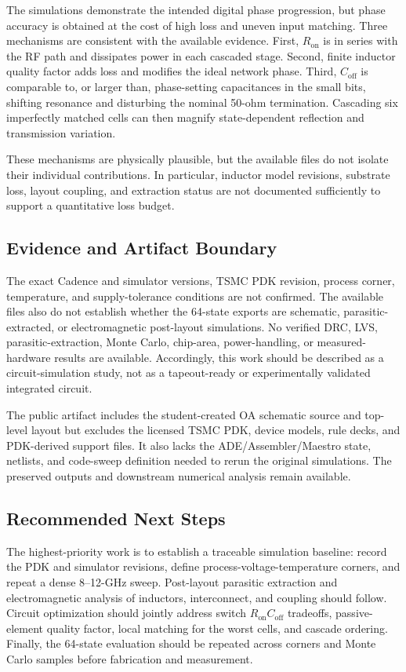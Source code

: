 \documentclass[conference]{IEEEtran}
\begin{document}
The simulations demonstrate the intended digital phase progression, but phase
accuracy is obtained at the cost of high loss and uneven input matching. Three
mechanisms are consistent with the available evidence. First,
$R_{\mathrm{on}}$ is in series with the RF path and dissipates power in each
cascaded stage. Second, finite inductor quality factor adds loss and modifies
the ideal network phase. Third, $C_{\mathrm{off}}$ is comparable to, or
larger than, phase-setting capacitances in the small bits, shifting resonance
and disturbing the nominal 50-ohm termination. Cascading six imperfectly
matched cells can then magnify state-dependent reflection and transmission
variation.

These mechanisms are physically plausible, but the available files do not
isolate their individual contributions. In particular, inductor model
revisions, substrate loss, layout coupling, and extraction status are not
documented sufficiently to support a quantitative loss budget.

\subsection{Evidence and Artifact Boundary}

The exact Cadence and simulator versions, TSMC PDK revision, process corner,
temperature, and supply-tolerance conditions are not confirmed. The available
files also do not establish whether the 64-state exports are schematic,
parasitic-extracted, or electromagnetic post-layout simulations. No verified
DRC, LVS, parasitic-extraction, Monte Carlo, chip-area, power-handling, or
measured-hardware results are available. Accordingly, this work should be
described as a circuit-simulation study, not as a tapeout-ready or
experimentally validated integrated circuit.

The public artifact includes the student-created OA schematic source and
top-level layout but excludes the licensed TSMC PDK, device models, rule decks,
and PDK-derived support files. It also lacks the ADE/Assembler/Maestro state,
netlists, and code-sweep definition needed to rerun the original simulations.
The preserved outputs and downstream numerical analysis remain available.

\subsection{Recommended Next Steps}

The highest-priority work is to establish a traceable simulation baseline:
record the PDK and simulator revisions, define process-voltage-temperature
corners, and repeat a dense 8--12-GHz sweep. Post-layout parasitic extraction
and electromagnetic analysis of inductors, interconnect, and coupling should
follow. Circuit optimization should jointly address switch
$R_{\mathrm{on}}C_{\mathrm{off}}$ tradeoffs, passive-element quality factor,
local matching for the worst cells, and cascade ordering. Finally, the
64-state evaluation should be repeated across corners and Monte Carlo samples
before fabrication and measurement.
\end{document}
